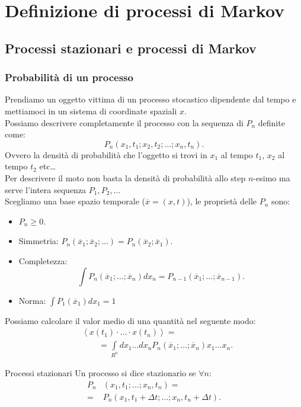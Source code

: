 \section{Definizione di processi di Markov}%
\label{sub:Lezione 4}
\mylocaltoc
\subsection{Processi stazionari e processi di Markov}%
\label{sub:Processi stazionari e processi di Markov}
\subsubsection{Probabilità di un processo}%
\label{subsub:Probabilità di un processo}
Prendiamo un oggetto vittima di un processo stocastico dipendente dal tempo e mettiamoci in un sistema di coordinate spaziali $x$. \\
Possiamo descrivere completamente il processo con la sequenza di $P_n$ definite come:
\[
    P_n(x_1,t_1; x_2,t_2; \ldots ; x_n,t_n) 
.\] 
Ovvero la densità di probabilità che l'oggetto si trovi in $x_1$ al tempo $t_1$, $x_2$ al tempo $t_2$ etc\ldots \\
Per descrivere il moto non basta la densità di probabilità allo step $n$-esimo ma serve l'intera sequenza $P_1, P_2, \ldots$\\
Scegliamo una base spazio temporale ($\overline{x} = (x,t)$), le proprietà delle $P_n$ sono:
\begin{itemize}
    \item $P_n \ge 0$.
    \item Simmetria: $P_n(\overline{x}_1;\overline{x}_2; \ldots) = P_n(\overline{x}_2; \overline{x}_1)$.
    \item Completezza:
	\[
	    \int P_n(\overline{x}_1;\ldots;\overline{x}_n) dx_n = P_{n-1}(\overline{x}_1;\ldots;\overline{x}_{n-1}) 
	.\] 
    \item Norma: $\int P_1(\overline{x}_1) dx_1 = 1$ 
\end{itemize}
Possiamo calcolare il valor medio di una quantità nel seguente modo:
\[\begin{aligned}
    &\left< x(t_1) \cdot \ldots \cdot x(t_n) \right> =\\
			     & \qquad=\int\limits_{R^n} dx_1\ldots dx_n P_n(\overline{x}_1;\ldots ;\overline{x}_n) x_1 \ldots x_n
.\end{aligned}\]

\begin{greenbox}{Processi stazionari}
    Un processo si dice stazionario se $\forall n$:
    \[\begin{aligned}
	P_n&(x_1,t_1;\ldots;x_n,t_n) =\\
	=&P_n(x_1,t_1+\Delta t;\ldots;x_n,t_n+\Delta t)
    .\end{aligned}\]
\end{greenbox}
\noindent
